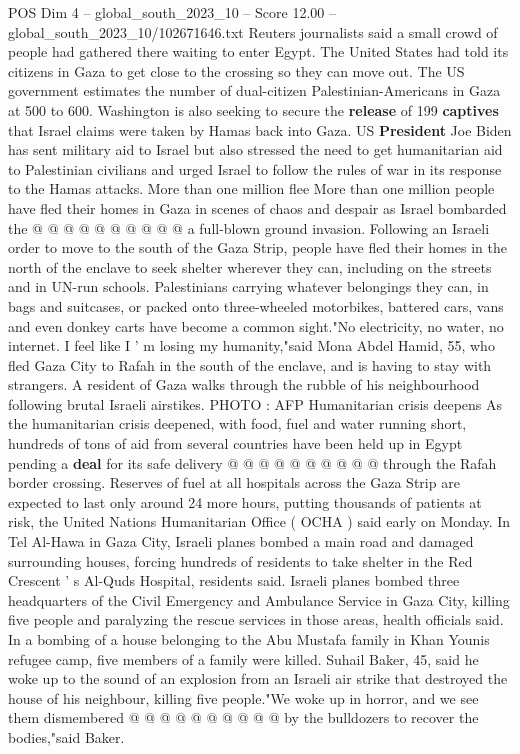 \begin{textsample}{POS Dim 4 – global\_south\_2023\_10 – Score 12.00 – global\_south\_2023\_10/102671646.txt}
Reuters journalists said a small crowd of people had gathered there waiting to enter Egypt.
The United States had told its citizens in Gaza to get close to the crossing so they can move out.
The US government estimates the number of dual-citizen Palestinian-Americans in Gaza at 500 to 600.
Washington is also seeking to secure the \textbf{release} of 199 \textbf{captives} that Israel claims were taken by Hamas back into Gaza.
US \textbf{President} Joe Biden has sent military aid to Israel but also stressed the need to get humanitarian aid to Palestinian civilians and urged Israel to follow the rules of war in its response to the Hamas attacks.
More than one million flee More than one million people have fled their homes in Gaza in scenes of chaos and despair as Israel bombarded the @ @ @ @ @ @ @ @ @ @ a full-blown ground invasion.
Following an Israeli order to move to the south of the Gaza Strip, people have fled their homes in the north of the enclave to seek shelter wherever they can, including on the streets and in UN-run schools.
Palestinians carrying whatever belongings they can, in bags and suitcases, or packed onto three-wheeled motorbikes, battered cars, vans and even donkey carts have become a common sight."No electricity, no water, no internet.
I feel like I ' m losing my humanity,"said Mona Abdel Hamid, 55, who fled Gaza City to Rafah in the south of the enclave, and is having to stay with strangers.
A resident of Gaza walks through the rubble of his neighbourhood following brutal Israeli airstikes.
PHOTO : AFP Humanitarian crisis deepens As the humanitarian crisis deepened, with food, fuel and water running short, hundreds of tons of aid from several countries have been held up in Egypt pending a \textbf{deal} for its safe delivery @ @ @ @ @ @ @ @ @ @ through the Rafah border crossing.
Reserves of fuel at all hospitals across the Gaza Strip are expected to last only around 24 more hours, putting thousands of patients at risk, the United Nations Humanitarian Office ( OCHA ) said early on Monday.
In Tel Al-Hawa in Gaza City, Israeli planes bombed a main road and damaged surrounding houses, forcing hundreds of residents to take shelter in the Red Crescent ' s Al-Quds Hospital, residents said.
Israeli planes bombed three headquarters of the Civil Emergency and Ambulance Service in Gaza City, killing five people and paralyzing the rescue services in those areas, health officials said.
In a bombing of a house belonging to the Abu Mustafa family in Khan Younis refugee camp, five members of a family were killed.
Suhail Baker, 45, said he woke up to the sound of an explosion from an Israeli air strike that destroyed the house of his neighbour, killing five people."We woke up in horror, and we see them dismembered @ @ @ @ @ @ @ @ @ @ by the bulldozers to recover the bodies,"said Baker.

\end{textsample}
